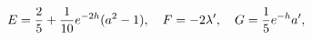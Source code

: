 \begin{equation}
E={2\over5}+{1\over10}e^{-2h}(a^2-1), \quad F=-2\lambda', \quad G={1\over5}e^{-h}a',
\end{equation}

